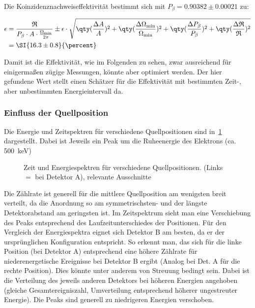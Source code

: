 \documentclass[slug=PET, room=Andreas-Schubert-Bau\,\ 424A,
supervisor=Carsten\ Bittrich, coursedate=10.\ 01.\ 2020, ngerman]{../../Lab_Report_LaTeX/lab_report}
\begin{document}
Die Koinzidenznachweiseffektivit\"at bestimmt sich
mit \(P_\beta = 0.90382\pm 0.00021\) zu:

\begin{align}
  \epsilon & = \frac{\mathfrak{R}}{P_\beta\cdot A \cdot
  \frac{\Omega_{\min}}{2\pi}} \pm \epsilon\cdot\sqrt{\qty(\frac{\Delta A}{A})^2 +
  \qty(\frac{\Delta\Omega_{\min}}{\Omega_{\min}})^2 +
  \qty(\frac{\Delta P_\beta}{P_\beta})^2 +
             \qty(\frac{\Delta\mathfrak{R}}{\mathfrak{R}})^2} \\
  & = \SI{16.3\pm 0.8}{\percent}
\end{align}

Damit ist die Effektivit\"at, wie im Folgenden zu sehen, zwar
ausreichend f\"ur einigerma\ss{}en z\"ugige Messungen, k\"onnte aber
optimiert werden. Der hier gefundene Wert stellt einen Sch\"atzer
f\"ur die Effektivit\"at mit bestimmten Zeit-, aber unbestimmten
Energieintervall da.


\subsubsection{Einfluss der Quellposition}
\label{sec:quellpos}

Die Energie und Zeitspektren f\"ur verschiedene Quellpositionen sind
in~\ref{fig:calibration-comp} dargestellt. Dabei ist Jeweils ein Peak
um die Ruheenergie des Elektrons (ca. \SI{500}{\kilo\electronvolt})
\begin{figure}[htb]\centering
  
  \caption[Vergleich der Quellpositionen]{Zeit und Energiespektren f\"ur verschiedene
    Quellpositionen. (Links \(=\) bei Detektor A), relevante Ausschnitte}
  \label{fig:calibration-comp}
\end{figure}

Die Z\"ahlrate ist generell f\"ur die mittlere Quellposition am
wenigsten breit verteilt, da die Anordnung so am symmetrischsten- und
der l\"angste Detektorabstand am geringsten ist. Im Zeitspektrum sieht
man eine Verschiebung des Peaks entsprechend des Laufzeitunterschiedes
der Positionen. F\"ur den Vergleich der Energiespektra eignet sich
Detektor B am besten, da er der urspr\"unglichen Konfiguration
entspricht. So erkennt man, das sich f\"ur die linke Position (bei
Detektor A) entsprechend eine h\"ohere Z\"ahlrate f\"ur
niederenergetische Ereignisse bei Detektor B ergibt (Analog bei Det. A
f\"ur die rechte Position). Dies k\"onnte unter anderem von Streuung
bedingt sein. Dabei ist die Verteilung des jeweils anderen Detektors
bei h\"oheren Energien angehoben (gleiche Gesamtereigniszahl,
Umverteilung entsprechend h\"oherer ungestreuter Energie).  Die Peaks
sind generell zu niedrigeren Energien verschoben.
\end{document}
